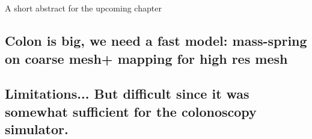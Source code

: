 \chapter{}
\label{chap8}
\begin{shortAbstract}
A short abstract for the upcoming chapter
\end{shortAbstract}


\section{Colon is big, we need a fast model: mass-spring on coarse mesh+ mapping for high res mesh}
		
\section{Limitations... But difficult since it was somewhat sufficient for the colonoscopy simulator.}